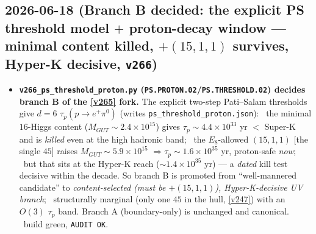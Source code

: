 \subsection*{2026-06-18 (Branch B decided: the explicit PS threshold model $+$ proton-decay window --- minimal content killed, $+(15,1,1)$ survives, Hyper-K decisive, \texttt{v266})}
\begin{itemize}
\item \textbf{\texttt{v266\_ps\_threshold\_proton.py} (\texttt{PS.PROTON.02}/\texttt{PS.THRESHOLD.02}) decides
  branch B of the \vref{v265} fork.} The explicit two-step Pati--Salam thresholds give $d{=}6$
  $\tau_p(p{\to}e^+\pi^0)$ (writes \texttt{ps\_threshold\_proton.json}): \mX\ the minimal $16$-Higgs content
  ($M_{GUT}{\sim}2.4{\times}10^{15}$) gives $\tau_p{\sim}4.4{\times}10^{33}$ yr $<$ Super-K and is
  \emph{killed} even at the high hadronic band; \mC\ the $E_8$-allowed $(15,1,1)$ [the single $45$] raises
  $M_{GUT}{\sim}5.9{\times}10^{15}$ $\Rightarrow\tau_p{\sim}1.6{\times}10^{35}$ yr, proton-safe \emph{now};
  \mX\ but that sits at the Hyper-K reach (${\sim}1.4{\times}10^{35}$ yr) --- a \emph{dated} kill test
  decisive within the decade. So branch B is promoted from ``well-mannered candidate'' to
  \emph{content-selected (must be $+(15,1,1)$), Hyper-K-decisive UV branch}; \mO\ structurally marginal
  (only one $45$ in the hull, \vref{v247}) with an $O(3)$ $\tau_p$ band. Branch A (boundary-only) is
  unchanged and canonical. \mE\ build green, \texttt{AUDIT OK}.
\end{itemize}


